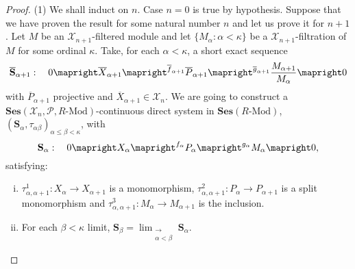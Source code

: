\documentclass[a4paper,10pt]{amsart}
\begin{document}
\begin{proof}
  (1) We shall induct on $n$. Case $n=0$ is true by
  hypothesis. Suppose that we have proven the result for some natural
  number $n$ and let us prove it for $n+1$. Let $M$ be an $\mathcal
  X_{n+1}$-filtered module and let $\{M_\alpha:\alpha < \kappa\}$ be a
  $\mathcal X_{n+1}$-filtration of $M$ for some ordinal
  $\kappa$. Take, for each $\alpha < \kappa$, a short exact sequence
  \begin{displaymath}
    \mathbf{\overline S}_{\alpha+1}: \quad 0 \mapright \overline
    X_{\alpha+1} \mapright^{\overline f_{\alpha+1}} \overline P_{\alpha
      +1} \mapright^{\overline g_{\alpha+1}} \frac{M_{\alpha+1}}{M_\alpha} \mapright 0
  \end{displaymath}
  with $\overline P_{\alpha + 1}$ projective and $\overline
  X_{\alpha+1} \in \mathcal X_n$. We are going to construct a
  $\textbf{Ses}(\mathcal X_n,\mathcal P, {R\textrm{-Mod}})$-continuous direct
  system in $\textbf{Ses}({R\textrm{-Mod}})$, $(\mathbf S_\alpha, \tau_{\alpha
    \beta})_{\alpha \leq \beta < \kappa}$, with
  \begin{displaymath}
    \mathbf{S}_\alpha: \quad    0 \mapright X_\alpha \mapright^{f_\alpha} P_\alpha \mapright^{g_\alpha} M_\alpha
    \mapright 0,
  \end{displaymath}
  satisfying:
  \begin{enumerate}[(i)]
  \item $\tau_{\alpha,\alpha+1}^1:X_\alpha \rightarrow X_{\alpha+1}$ is a monomorphism,
    $\tau_{\alpha,\alpha+1}^2:P_\alpha\rightarrow P_{\alpha+1}$ is a
    split monomorphism and $\tau_{\alpha,\alpha+1}^3:M_\alpha
    \rightarrow M_{\alpha+1}$ is the inclusion.

  \item For each $\beta < \kappa$ limit, $\displaystyle \mathbf
    S_\beta = \lim_{\substack{\longrightarrow\\\alpha < \beta}}\mathbf
    S_\alpha$.
  \end{enumerate}


\end{proof}
\end{document}
